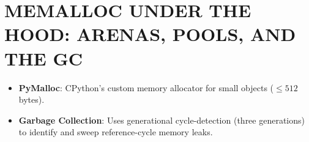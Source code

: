 \hypertarget{memalloc-under-the-hood-arenas-pools-and-the-gc}{%
\chapter{MEMALLOC UNDER THE HOOD: ARENAS, POOLS, AND THE
GC}\label{memalloc-under-the-hood-arenas-pools-and-the-gc}}

\begin{itemize}
\tightlist
\item
  \textbf{PyMalloc}: CPython's custom memory allocator for small objects
  (\(\le 512\) bytes).
\item
  \textbf{Garbage Collection}: Uses generational cycle-detection (three
  generations) to identify and sweep reference-cycle memory leaks.
\end{itemize}
